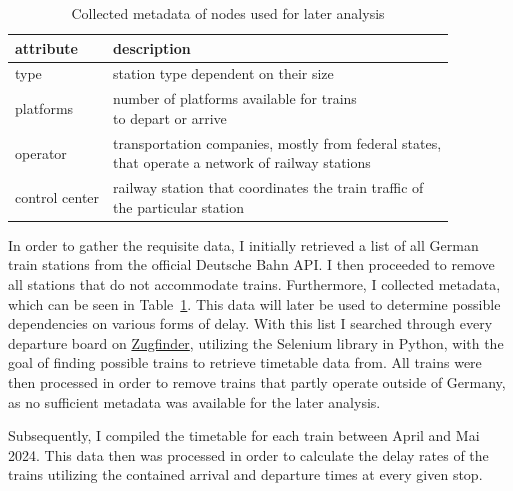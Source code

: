 \documentclass[12pt,a4paper]{article}
\begin{document}
\begin{table}[b]
  \centering
  \begin{tabular}{ll}
  \hline
  attribute      & description                                                                                      \\ \hline
  type           & station type dependent on their size                                                             \\
  platforms      & \makecell{number of platforms available for trains \\ to depart or arrive}                                     \\
  operator       & \makecell{transportation companies, mostly from federal states, \\ that operate a network of railway stations} \\
  control center & \makecell{railway station that coordinates the train traffic of \\ the particular station}                     \\ \hline
  \end{tabular}
  \caption{Collected metadata of nodes used for later analysis}
  \label{fig:network-metadata}
\end{table}

In order to gather the requisite data, I initially retrieved a list of all German train stations from the official Deutsche Bahn API. 
I then proceeded to remove all stations that do not accommodate trains. Furthermore, I collected metadata, which can be seen in Table~\ref{fig:network-metadata}. 
This data will later be used to determine possible dependencies on various forms of delay. With this list I searched through every departure board on \href{https://www.zugfinder.net/en/start}{Zugfinder}, utilizing the Selenium library in Python, with the goal of finding possible trains to retrieve timetable data from. 
All trains were then processed in order to remove trains that partly operate outside of Germany, as no sufficient metadata was available for the later analysis. 

Subsequently, I compiled the timetable for each train between April and Mai 2024. This data then was processed in order to calculate the delay rates of the trains utilizing the contained arrival and departure times at every given stop.

\maketitle
\end{document}
